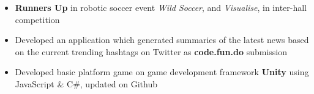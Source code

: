 
\begin{itemize}
  \item \textbf{Runners Up} in robotic soccer event \emph{Wild Soccer}, and \emph{Visualise}, in inter-hall competition
  \item Developed an application which generated summaries of the latest news based on the current trending hashtags on Twitter as \textbf{code.fun.do} submission
  \item Developed basic platform game on game development framework \textbf{Unity} using JavaScript & C\#, updated on Github
    \vspace{-1mm}
\end{itemize}